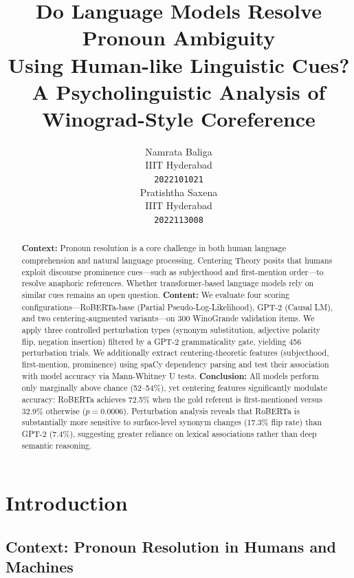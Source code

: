 \documentclass[11pt]{article}
\title{Do Language Models Resolve Pronoun Ambiguity\\Using Human-like Linguistic Cues?\\
\large A Psycholinguistic Analysis of Winograd-Style Coreference}
\author{Namrata Baliga \\
  IIIT Hyderabad \\
  \texttt{2022101021} \\\And
  Pratishtha Saxena \\
  IIIT Hyderabad \\
  \texttt{2022113008} \\}
\begin{document}
\maketitle

\begin{abstract}
\noindent
\textbf{Context:} Pronoun resolution is a core challenge in both human language comprehension and natural language processing. Centering Theory posits that humans exploit discourse prominence cues---such as subjecthood and first-mention order---to resolve anaphoric references. Whether transformer-based language models rely on similar cues remains an open question.
\textbf{Content:} We evaluate four scoring configurations---RoBERTa-base (Partial Pseudo-Log-Likelihood), GPT-2 (Causal LM), and two centering-augmented variants---on 300 WinoGrande validation items. We apply three controlled perturbation types (synonym substitution, adjective polarity flip, negation insertion) filtered by a GPT-2 grammaticality gate, yielding 456 perturbation trials. We additionally extract centering-theoretic features (subjecthood, first-mention, prominence) using spaCy dependency parsing and test their association with model accuracy via Mann-Whitney U tests.
\textbf{Conclusion:} All models perform only marginally above chance (52--54\%), yet centering features significantly modulate accuracy: RoBERTa achieves 72.5\% when the gold referent is first-mentioned versus 32.9\% otherwise ($p=0.0006$). Perturbation analysis reveals that RoBERTa is substantially more sensitive to surface-level synonym changes (17.3\% flip rate) than GPT-2 (7.4\%), suggesting greater reliance on lexical associations rather than deep semantic reasoning.
\end{abstract}

\tableofcontents
\newpage

\section{Introduction}

\subsection{Context: Pronoun Resolution in Humans and Machines}
\end{document}
